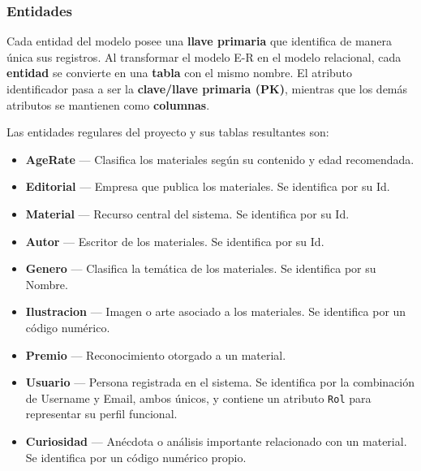 \documentclass[12pt,a4paper]{article}
\begin{document}
\subsubsection{Entidades}
Cada entidad del modelo posee una \textbf{llave primaria} que identifica de manera única sus registros.
Al transformar el modelo E-R en el modelo relacional, cada \textbf{entidad} se convierte en una \textbf{tabla} con el mismo nombre. El atributo identificador pasa a ser la \textbf{clave/llave primaria (PK)}, mientras que los demás atributos se mantienen como \textbf{columnas}.

Las entidades regulares del proyecto y sus tablas resultantes son:

\begin{itemize}

    \item \textbf{AgeRate} — Clasifica los materiales según su contenido y edad
    recomendada.

    \item \textbf{Editorial} — Empresa que publica los materiales. Se identifica
    por su Id.

    \item \textbf{Material} — Recurso central del sistema. Se identifica por su Id.

    \item \textbf{Autor} — Escritor de los materiales. Se identifica por su Id.

    \item \textbf{Genero} — Clasifica la temática de los materiales. Se identifica
    por su Nombre.


    \item \textbf{Ilustracion} — Imagen o arte asociado a los materiales. Se
    identifica por un código numérico.


    \item \textbf{Premio} — Reconocimiento otorgado a un material.
    \item \textbf{Usuario} — Persona registrada en el sistema. Se identifica por la
    combinación de Username y Email, ambos únicos, y contiene un atributo \texttt{Rol}
    para representar su perfil funcional.


    \item \textbf{Curiosidad} — Anécdota o análisis importante relacionado con un
    material. Se identifica por un código numérico propio.



\end{itemize}
\end{document}
